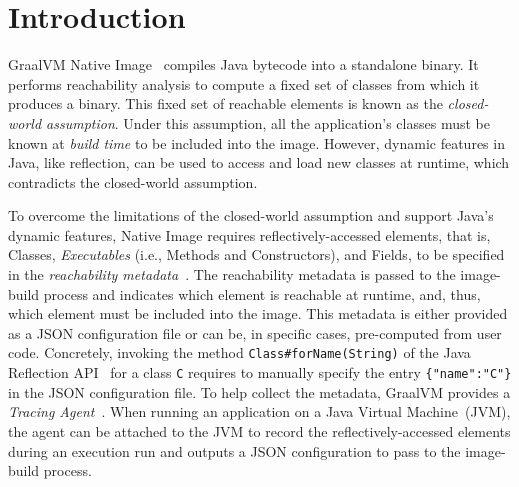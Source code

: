 \chapter{Introduction}


GraalVM Native Image~\cite{noauthor_native_nodate} compiles Java bytecode into a standalone binary. It performs reachability analysis to compute a fixed set of classes from which it produces a binary. This fixed set of reachable elements is known as the \emph{closed-world assumption}.
Under this assumption, all the application's classes must be known at \emph{build time} to be included into the image. 
However, dynamic features in Java, like reflection, can be used to access and load new classes at runtime, which contradicts the closed-world assumption. 

To overcome the limitations of the closed-world assumption and support Java's dynamic features, Native Image requires reflectively-accessed elements, that is, Classes, \emph{Executables} (i.e., Methods and Constructors), and Fields, to be specified in the \emph{reachability metadata}~\cite{noauthor_reachability_nodate}. The reachability metadata is passed to the image-build process and indicates which element is reachable at runtime, and, thus, which element must be included into the image. This metadata is either provided as a JSON configuration file or can be, in specific cases, pre-computed from user code. Concretely, invoking the method \verb|Class#forName(String)| of the Java Reflection API~\cite{noauthor_core_nodate} for a class \verb|C| requires to manually specify the entry \verb|{"name":"C"}| in the JSON configuration file.
To help collect the metadata, GraalVM provides a \emph{Tracing Agent}~\cite{noauthor_collect_nodate}. When running an application on a Java Virtual Machine~(JVM), the agent can be attached to the JVM to record the reflectively-accessed elements during an execution run and outputs a JSON configuration to pass to the image-build process.

